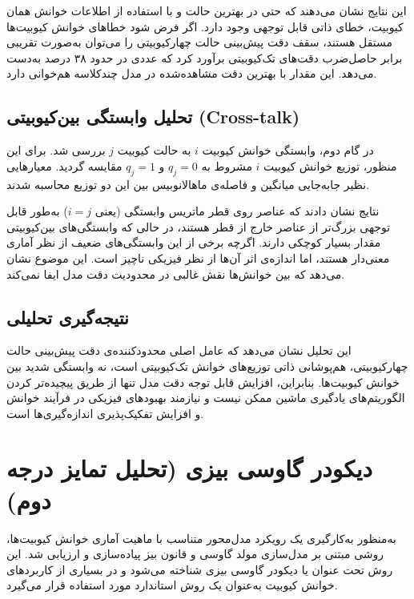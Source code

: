 این نتایج نشان می‌دهند که حتی در بهترین حالت و با استفاده از اطلاعات خوانش همان کیوبیت، خطای ذاتی قابل توجهی وجود دارد. اگر فرض شود خطاهای خوانش کیوبیت‌ها مستقل هستند، سقف دقت پیش‌بینی حالت چهارکیوبیتی را می‌توان به‌صورت تقریبی برابر حاصل‌ضرب دقت‌های تک‌کیوبیتی برآورد کرد که عددی در حدود ۳۸ درصد به‌دست می‌دهد. این مقدار با بهترین دقت مشاهده‌شده در مدل چندکلاسه هم‌خوانی دارد.

\subsection{تحلیل وابستگی بین‌کیوبیتی (Cross-talk)}
در گام دوم، وابستگی خوانش کیوبیت $i$ به حالت کیوبیت $j$ بررسی شد. برای این منظور، توزیع خوانش کیوبیت $i$ مشروط به $q_j=0$ و $q_j=1$ مقایسه گردید. معیارهایی نظیر جابه‌جایی میانگین و فاصله‌ی ماهالانوبیس بین این دو توزیع محاسبه شدند.

نتایج نشان دادند که عناصر روی قطر ماتریس وابستگی (یعنی $i=j$) به‌طور قابل توجهی بزرگ‌تر از عناصر خارج از قطر هستند، در حالی که وابستگی‌های بین‌کیوبیتی مقدار بسیار کوچکی دارند. اگرچه برخی از این وابستگی‌های ضعیف از نظر آماری معنی‌دار هستند، اما اندازه‌ی اثر آن‌ها از نظر فیزیکی ناچیز است. این موضوع نشان می‌دهد که  بین خوانش‌ها نقش غالبی در محدودیت دقت مدل ایفا نمی‌کند.

\subsection{نتیجه‌گیری تحلیلی}
این تحلیل نشان می‌دهد که عامل اصلی محدودکننده‌ی دقت پیش‌بینی حالت چهارکیوبیتی، هم‌پوشانی ذاتی توزیع‌های خوانش تک‌کیوبیتی است، نه وابستگی شدید بین خوانش کیوبیت‌ها. بنابراین، افزایش قابل توجه دقت مدل تنها از طریق پیچیده‌تر کردن الگوریتم‌های یادگیری ماشین ممکن نیست و نیازمند بهبودهای فیزیکی در فرآیند خوانش و افزایش تفکیک‌پذیری اندازه‌گیری‌ها است.


\section{دیکودر گاوسی بیزی (تحلیل تمایز درجه دوم)}
به‌منظور به‌کارگیری یک رویکرد مدل‌محور متناسب با ماهیت آماری خوانش کیوبیت‌ها، روشی مبتنی بر مدل‌سازی مولد گاوسی و قانون بیز پیاده‌سازی و ارزیابی شد. این روش تحت عنوان  یا دیکودر گاوسی بیزی شناخته می‌شود و در بسیاری از کاربردهای خوانش کیوبیت به‌عنوان یک روش استاندارد مورد استفاده قرار می‌گیرد.


